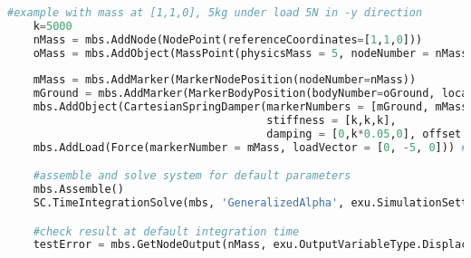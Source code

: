 \begin{lstlisting}[language=Python, firstnumber=1]
    #example with mass at [1,1,0], 5kg under load 5N in -y direction
    k=5000
    nMass = mbs.AddNode(NodePoint(referenceCoordinates=[1,1,0]))
    oMass = mbs.AddObject(MassPoint(physicsMass = 5, nodeNumber = nMass))
    
    mMass = mbs.AddMarker(MarkerNodePosition(nodeNumber=nMass))
    mGround = mbs.AddMarker(MarkerBodyPosition(bodyNumber=oGround, localPosition = [1,1,0]))
    mbs.AddObject(CartesianSpringDamper(markerNumbers = [mGround, mMass], 
                                        stiffness = [k,k,k], 
                                        damping = [0,k*0.05,0], offset = [0,0,0]))
    mbs.AddLoad(Force(markerNumber = mMass, loadVector = [0, -5, 0])) #static solution=-5/5000=-0.001m

    #assemble and solve system for default parameters
    mbs.Assemble()
    SC.TimeIntegrationSolve(mbs, 'GeneralizedAlpha', exu.SimulationSettings())

    #check result at default integration time
    testError = mbs.GetNodeOutput(nMass, exu.OutputVariableType.Displacement)[1] - (-0.00099999999997058)

\end{lstlisting}

\newpage

